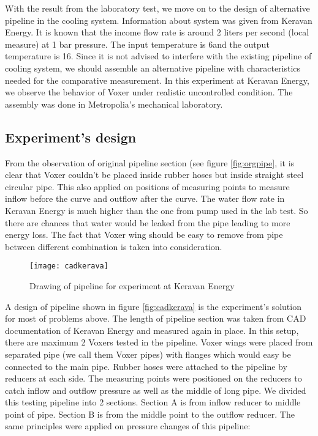 With the result from the laboratory test, we move on to the design of alternative pipeline in the cooling system. Information about system was given from Keravan Energy. It is known that the income flow rate is around 2 liters per second (local measure) at 1 bar pressure. The input temperature is 6\celsius and the output temperature is 16\celsius. 
Since it is not advised to interfere with the existing pipeline of cooling system, we should assemble an alternative pipeline with characteristics needed for the comparative measurement. In this experiment at Keravan Energy, we observe the behavior of Voxer under realistic uncontrolled condition. The assembly was done in Metropolia's mechanical laboratory.  

\subsection{Experiment's design}

From the observation of original pipeline section (see figure \vref{fig:orgpipe}, it is clear that Voxer couldn't be placed inside rubber hoses but inside straight steel circular pipe. This also applied on positions of measuring points to measure inflow before the curve and outflow after the curve. The water flow rate in Keravan Energy is much higher than the one from pump used in the lab test. So there are chances that water would be leaked from the pipe leading to more energy loss. The fact that Voxer wing should be easy to remove from pipe between different combination is taken into consideration.

\begin{figure}[h]
  \centering
  \texttt{[image: cadkerava]}
  \caption{ Drawing of pipeline for experiment at Keravan Energy}
  \label{fig:cadkerava}
\end{figure}

A design of pipeline shown in figure \vref{fig:cadkerava} is the experiment's solution for most of problems above. The length of pipeline section was taken from CAD documentation of Keravan Energy and measured again in place. In this setup, there are maximum 2 Voxers tested in the pipeline. Voxer wings were placed from separated pipe (we call them Voxer pipes) with flanges which would easy be connected to the main pipe. 
Rubber hoses were attached to the pipeline by reducers at each side. The measuring points were positioned on the reducers to catch inflow and outflow pressure as well as the middle of long pipe. We divided this testing pipeline into 2 sections. Section A is from inflow reducer to middle point of pipe. Section B is from the middle point to the outflow reducer. The same principles were applied on pressure changes of this pipeline: 

